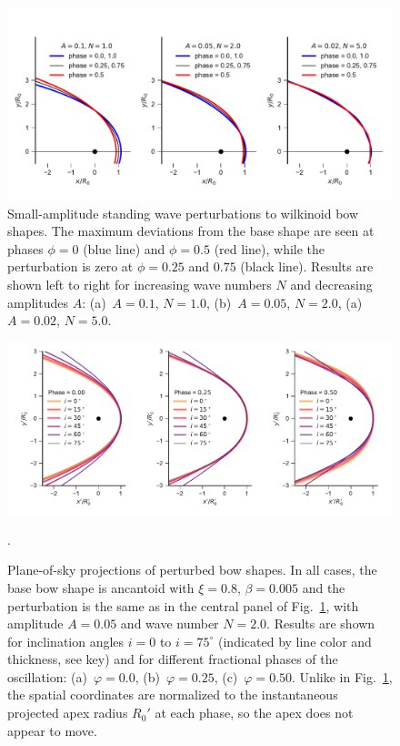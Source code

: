 \begin{figure}[t!]
  \centering
  \includegraphics[width=\linewidth]{figs/compare_xyprime_wave-wilkinoid}
  \caption{Small-amplitude standing wave perturbations to wilkinoid
    bow shapes.  The maximum deviations from the base shape are seen
    at phases \(\phi = 0\) (blue line) and \(\phi = 0.5\) (red line), while
    the perturbation is zero at \(\phi = 0.25\) and \(0.75\) (black
    line).  Results are shown left to right for increasing wave
    numbers \(N\) and decreasing amplitudes \(A\): (a)~\(A = 0.1\),
    \(N = 1.0\), (b)~\(A = 0.05\), \(N = 2.0\), (a)~\(A = 0.02\),
    \(N = 5.0\).}
  \label{fig:perturb-shapes}
\end{figure}

\begin{figure}
  \centering
  \includegraphics[width=\linewidth]
  {figs/wave_xyprime-A005-N20-ancantoid-xi080-beta000500}
  \caption{Plane-of-sky projections of perturbed bow shapes.  In all
    cases, the base bow shape is ancantoid with \(\xi = 0.8\),
    \(\beta = 0.005\) and the perturbation is the same as in the central
    panel of Fig.~\ref{fig:perturb-shapes}, with amplitude
    \(A = 0.05\) and wave number \(N = 2.0\). Results are shown for
    inclination angles \(i = 0\) to \(i = 75^\circ\) (indicated by line
    color and thickness, see key) and for different fractional phases
    of the oscillation: (a)~\(\varphi = 0.0\), (b)~\(\varphi = 0.25\),
    (c)~\(\varphi = 0.50\). Unlike in Fig.~\ref{fig:perturb-shapes},
    the spatial coordinates are normalized to the instantaneous
    projected apex radius \(R_0'\) at each phase, so the apex does not
    appear to move.}.
  \label{fig:perturb-xy-prime}
\end{figure}

